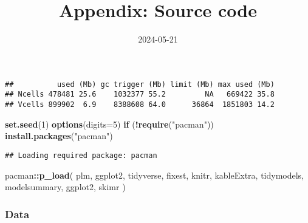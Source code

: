 \documentclass[
]{article}
\title{Appendix: Source code}
\author{}
\date{\vspace{-2.5em}2024-05-21}
\newenvironment{Shaded}{\begin{snugshade}}{\end{snugshade}}
\newcommand{\AttributeTok}[1]{\textcolor[rgb]{0.13,0.29,0.53}{#1}}
\newcommand{\ConstantTok}[1]{\textcolor[rgb]{0.56,0.35,0.01}{#1}}
\newcommand{\ControlFlowTok}[1]{\textcolor[rgb]{0.13,0.29,0.53}{\textbf{#1}}}
\newcommand{\DecValTok}[1]{\textcolor[rgb]{0.00,0.00,0.81}{#1}}
\newcommand{\FunctionTok}[1]{\textcolor[rgb]{0.13,0.29,0.53}{\textbf{#1}}}
\newcommand{\NormalTok}[1]{#1}
\newcommand{\SpecialCharTok}[1]{\textcolor[rgb]{0.81,0.36,0.00}{\textbf{#1}}}
\newcommand{\StringTok}[1]{\textcolor[rgb]{0.31,0.60,0.02}{#1}}
\begin{document}
\maketitle

\begin{Shaded}
\end{Shaded}

\begin{verbatim}
##          used (Mb) gc trigger (Mb) limit (Mb) max used (Mb)
## Ncells 478481 25.6    1032377 55.2         NA   669422 35.8
## Vcells 899902  6.9    8388608 64.0      36864  1851803 14.2
\end{verbatim}

\begin{Shaded}
\begin{Highlighting}[]
\FunctionTok{set.seed}\NormalTok{(}\DecValTok{1}\NormalTok{)}
\FunctionTok{options}\NormalTok{(}\AttributeTok{digits=}\DecValTok{5}\NormalTok{) }
\ControlFlowTok{if}\NormalTok{ (}\SpecialCharTok{!}\FunctionTok{require}\NormalTok{(}\StringTok{"pacman"}\NormalTok{)) }\FunctionTok{install.packages}\NormalTok{(}\StringTok{"pacman"}\NormalTok{)}
\end{Highlighting}
\end{Shaded}

\begin{verbatim}
## Loading required package: pacman
\end{verbatim}

\begin{Shaded}
\begin{Highlighting}[]
\NormalTok{pacman}\SpecialCharTok{::}\FunctionTok{p\_load}\NormalTok{(}
\NormalTok{  plm,}
\NormalTok{  ggplot2,}
\NormalTok{  tidyverse,}
\NormalTok{  fixest,}
\NormalTok{  knitr,}
\NormalTok{  kableExtra,}
\NormalTok{  tidymodels,}
\NormalTok{  modelsummary,}
\NormalTok{  ggplot2,}
\NormalTok{  skimr}
\NormalTok{)}
\end{Highlighting}
\end{Shaded}

\hypertarget{data}{%
\subsubsection{Data}\label{data}}
\end{document}

